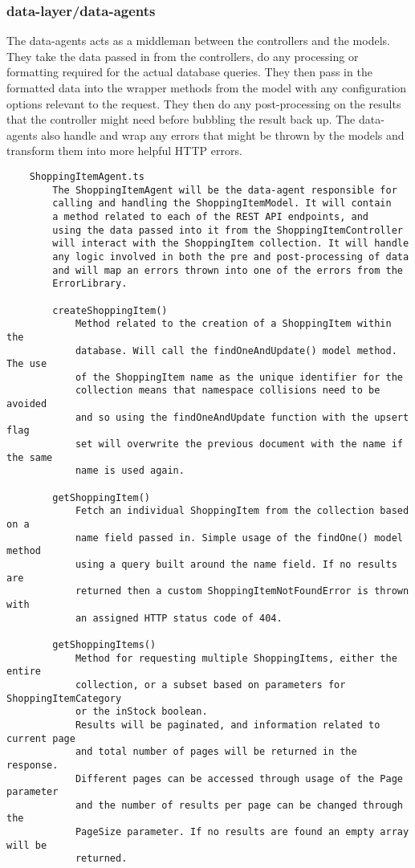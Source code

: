 \subsubsection{data-layer/data-agents}
The data-agents acts as a middleman between the controllers and the models. They take the data passed in from the controllers, do any processing or formatting required for the actual database queries. They then pass in the formatted data into the wrapper methods from the model with any configuration options relevant to the request. They then do any post-processing on the results that the controller might need before bubbling the result back up. The data-agents also handle and wrap any errors that might be thrown by the models and transform them into more helpful HTTP errors.
\begin{verbatim}
    ShoppingItemAgent.ts
        The ShoppingItemAgent will be the data-agent responsible for 
        calling and handling the ShoppingItemModel. It will contain 
        a method related to each of the REST API endpoints, and 
        using the data passed into it from the ShoppingItemController
        will interact with the ShoppingItem collection. It will handle
        any logic involved in both the pre and post-processing of data
        and will map an errors thrown into one of the errors from the 
        ErrorLibrary.
        
        createShoppingItem()
            Method related to the creation of a ShoppingItem within the
            database. Will call the findOneAndUpdate() model method. The use
            of the ShoppingItem name as the unique identifier for the
            collection means that namespace collisions need to be avoided
            and so using the findOneAndUpdate function with the upsert flag
            set will overwrite the previous document with the name if the same
            name is used again.
        
        getShoppingItem()
            Fetch an individual ShoppingItem from the collection based on a
            name field passed in. Simple usage of the findOne() model method
            using a query built around the name field. If no results are 
            returned then a custom ShoppingItemNotFoundError is thrown with 
            an assigned HTTP status code of 404.
        
        getShoppingItems()
            Method for requesting multiple ShoppingItems, either the entire
            collection, or a subset based on parameters for ShoppingItemCategory
            or the inStock boolean.
            Results will be paginated, and information related to current page
            and total number of pages will be returned in the response.
            Different pages can be accessed through usage of the Page parameter 
            and the number of results per page can be changed through the 
            PageSize parameter. If no results are found an empty array will be
            returned. 
        

\end{verbatim}
